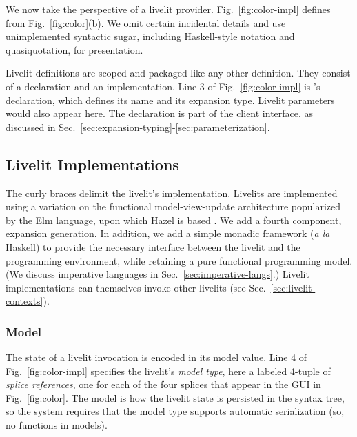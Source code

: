 \noindent
We now take the perspective of a livelit provider.
Fig.~\ref{fig:color-impl}
defines  from Fig.~\ref{fig:color}(b). We omit certain 
incidental details and use unimplemented syntactic sugar, including
Haskell-style  notation and quasiquotation, for presentation.

Livelit definitions are scoped and packaged like 
any other definition. They consist of a declaration and an implementation. 
Line 3 of Fig.~\ref{fig:color-impl} is 's declaration,
which defines its name and its {expansion type}. 
Livelit parameters would also appear here. 
The declaration is part of the client interface, 
as discussed in Sec.~\ref{sec:expansion-typing}-\ref{sec:parameterization}. 

\subsection{Livelit Implementations}
The curly braces delimit the livelit's implementation. 
Livelits are implemented using a variation on the functional model-view-update
architecture popularized by the Elm language, upon which Hazel is based \cite{ElmArchitecture}. We add a fourth component,
expansion generation. In addition, we add a simple monadic framework (\emph{a la} Haskell) to provide the necessary  
interface between the livelit and the programming environment, while retaining
a pure functional programming model. (We discuss imperative languages in Sec.~\ref{sec:imperative-langs}.)
Livelit implementations can themselves invoke other livelits (see Sec.~\ref{sec:livelit-contexts}).

\subsubsection{Model}\label{sec:model}
The state of a livelit invocation is encoded in its model value. 
Line 4 of Fig.~\ref{fig:color-impl} specifies the livelit's \emph{model type},
here a labeled 4-tuple of \emph{splice references}, one for each of the four splices
that appear in the GUI in Fig.~\ref{fig:color}.
The model is how the livelit state is persisted in the syntax tree, so 
 the system requires that the model type supports automatic serialization
 (so, no functions in models).

